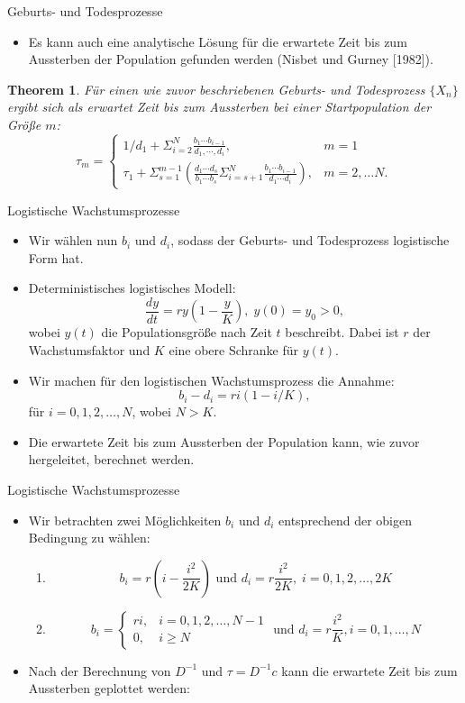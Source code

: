 \documentclass{beamer}
\newtheorem{thm}{Theorem}
\begin{document}
\begin{frame}{Geburts- und Todesprozesse}
  \begin{itemize}
  \item Es kann auch eine analytische Lösung für die erwartete Zeit bis zum Aussterben der Population gefunden werden (Nisbet und Gurney [1982]).
  \end{itemize}
  \begin{thm}
    Für einen wie zuvor beschriebenen Geburts- und Todesprozess $\{X_n\}$ ergibt sich als erwartet Zeit bis zum Aussterben bei einer Startpopulation der Größe $m$:
    \[
      τ_m = \begin{cases}
        1/d_1 + Σ_{i=2}^N \frac{b_1\cdots b_{i-1}}{d_1, \cdots, d_i}, &m = 1 \\
        τ_1 + Σ_{s=1}^{m-1}\left(\frac{d_1\cdots d_s}{b_1\cdots b_s} Σ_{i = s+1}^N \frac{b_1\cdots b_{i-1}}{d_1\cdots d_i}\right), &m = 2, \dots N.
      \end{cases}
    \]
  \end{thm}
\end{frame}
\begin{frame}{Logistische Wachstumsprozesse}
  \begin{itemize}
  \item Wir wählen nun $b_i$ und $d_i$, sodass der Geburts- und Todesprozess logistische Form hat.
  \item Deterministisches logistisches Modell:
    \[
      \frac{dy}{dt} = ry(1-\frac{y}{K}), \; y(0) = y_0 > 0,
    \]
    wobei $y(t)$ die Populationsgröße nach Zeit $t$ beschreibt. Dabei ist $r$ der Wachstumsfaktor und $K$ eine obere Schranke für $y(t)$.
  \item Wir machen für den logistischen Wachstumsprozess die Annahme:
    \[
      b_i - d_i = ri(1-i/K),
    \]
    für $i=0,1,2,\dots,N$, wobei $N > K$.
  \item Die erwartete Zeit bis zum Aussterben der Population kann, wie zuvor hergeleitet, berechnet werden.
  \end{itemize}
\end{frame}
\begin{frame}{Logistische Wachstumsprozesse}
  \begin{itemize}
  \item Wir betrachten zwei Möglichkeiten $b_i$ und $d_i$ entsprechend der obigen Bedingung zu wählen:
    \begin{enumerate}
    \item \[b_i = r(i - \frac{i^2}{2K}) \text{ und } d_i = r\frac{i^2}{2K}, \; i = 0,1,2,\dots,2K \]
    \item \[b_i = \begin{cases} ri,  &i = 0,1,2,\dots,N-1 \\ 0, &i \geq N \end{cases} \text{ und } d_i = r\frac{i^2}{K}, i = 0,1,\dots,N\]
    \end{enumerate}
  \item Nach der Berechnung von $D^{-1}$ und $τ = D^{-1}c$ kann die erwartete Zeit bis zum Aussterben geplottet werden:
  \end{itemize}
\end{frame}
\end{document}
